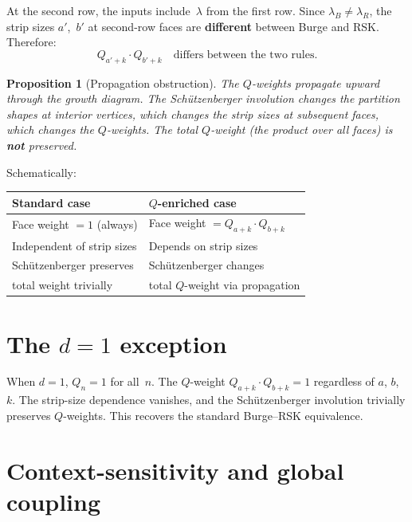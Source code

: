 \documentclass[11pt]{article}
\theoremstyle{plain}
\newtheorem{proposition}[theorem]{Proposition}
\theoremstyle{definition}
\begin{document}
At the second row, the inputs include~$\lambda$ from the first
row.  Since $\lambda_B \neq \lambda_R$, the strip sizes
$a'$,~$b'$ at second-row faces are \textbf{different} between
Burge and RSK.  Therefore:
\[
  Q_{a'+k} \cdot Q_{b'+k}
  \quad\text{differs between the two rules.}
\]

\begin{proposition}[Propagation obstruction]
\label{prop:obstruction}
The $Q$-weights propagate upward through the growth diagram.  The
Sch\"utzenberger involution changes the partition shapes at
interior vertices, which changes the strip sizes at subsequent
faces, which changes the $Q$-weights.  The total $Q$-weight
(the product over all faces) is \textbf{not} preserved.
\end{proposition}

Schematically:
\begin{center}
\begin{tabular}{l|l}
\textbf{Standard case} & \textbf{$Q$-enriched case} \\ \hline
Face weight $= 1$ (always) &
  Face weight $= Q_{a+k} \cdot Q_{b+k}$ \\[3pt]
Independent of strip sizes &
  Depends on strip sizes \\[3pt]
Sch\"utzenberger preserves &
  Sch\"utzenberger changes \\
total weight trivially &
  total $Q$-weight via propagation
\end{tabular}
\end{center}


\section{The $d = 1$ exception}
\label{sec:d1}

When $d = 1$, $Q_n = 1$ for all~$n$.  The $Q$-weight
$Q_{a+k} \cdot Q_{b+k} = 1$ regardless of $a$, $b$, $k$.  The
strip-size dependence vanishes, and the Sch\"utzenberger
involution trivially preserves $Q$-weights.  This recovers the
standard Burge--RSK equivalence.


\section{Context-sensitivity and global coupling}
\label{sec:context}
\end{document}

